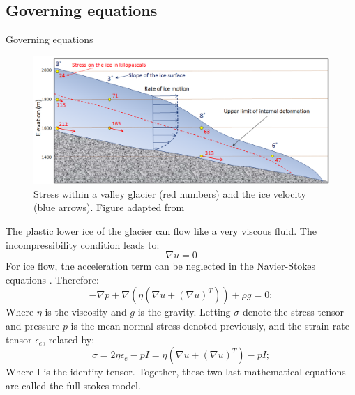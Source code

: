 \documentclass[11pt]{beamer}
\begin{document}
	\subsection{Governing equations}
		\begin{frame}[allowframebreaks]{Governing equations}
		\justifying
			\begin{figure}
				\centering
				\includegraphics[scale=0.3]{../fig/ice_flow.png}
				\caption{Stress within a valley glacier (red numbers) and the ice velocity (blue arrows). Figure adapted from \cite{earle2015physical}}
				\label{Flow_ice}
			\end{figure}
		The plastic lower ice of the glacier can flow like a very viscous fluid. The incompressibility condition leads to:
		\begin{equation}
			\nabla u=0
		\end{equation}
		For ice flow, the acceleration term can be neglected in the Navier-Stokes equations \cite[]{hutter1982mathematical}. Therefore:
		\begin{equation}
			-\nabla p+\nabla (\eta (\nabla u+(\nabla u)^T))+\rho g = 0;
		\end{equation}
		Where $\eta$ is the viscosity and $g$ is the gravity. Letting $\sigma$ denote the stress tensor and pressure $p$ is the mean normal stress denoted previously, and the strain rate tensor $\epsilon_{e}$, related by:
		\begin{equation}
			\sigma=2\eta \epsilon_{e}-pI = \eta (\nabla u+(\nabla u)^T)-pI; 
		\end{equation}
		Where I is the identity tensor. Together, these two last mathematical equations are called the full-stokes model.
		\end{frame}
\end{document}

